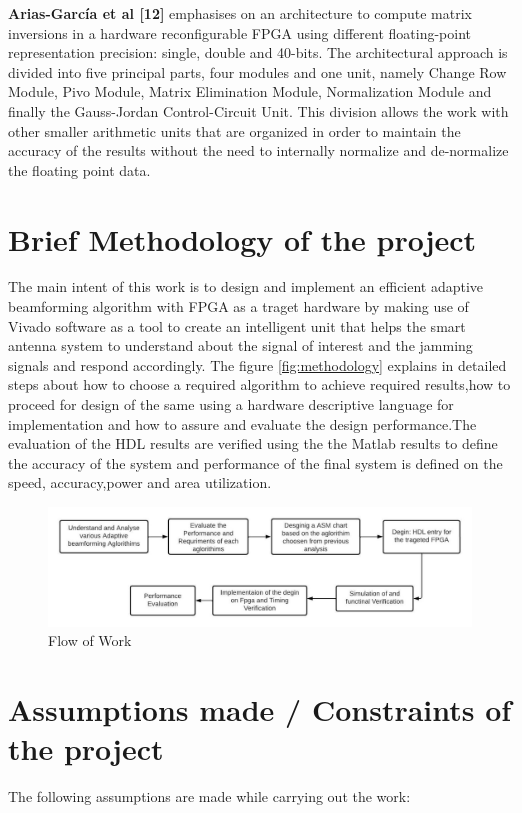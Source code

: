 \textbf{Arias-García et al [12]} emphasises on an architecture to compute matrix inversions in a hardware reconfigurable FPGA using different floating-point representation precision: single, double and 40-bits. The architectural approach is divided into five principal parts, four modules and one unit, namely Change Row Module, Pivo Module, Matrix Elimination Module, Normalization Module and finally the Gauss-Jordan Control-Circuit Unit. This division allows the work with other smaller arithmetic units that are organized in order to maintain the accuracy of the results without the need to internally normalize and de-normalize the floating point data.\\ 

\section[Brief Methodology of the project]{\textbf{Brief Methodology of the project}}
The main intent of this work is to design and implement  an efficient adaptive beamforming algorithm with FPGA as a traget hardware by making use of Vivado  software as a tool to create an intelligent unit that helps the smart antenna system to understand about the  signal of interest and the jamming signals and respond accordingly. The figure \ref{fig:methodology} explains in detailed steps about how to choose a required algorithm to achieve required results,how to proceed for design of the same using a hardware descriptive language for implementation and how to assure and evaluate the design performance.The evaluation of the HDL results are verified using the the Matlab results to define the accuracy of the system and performance of the final system is defined on the speed, accuracy,power and area utilization.
\begin{figure}[h]
\centering
	\includegraphics[scale=0.5]{Chapter1/Figures/methodology}	
	\caption{Flow of Work}
	\label{fig:era}
\end{figure}

\section[Assumptions made / Constraints of the project]{\textbf{Assumptions made / Constraints of the project}}
The following assumptions are made while carrying out the work:

